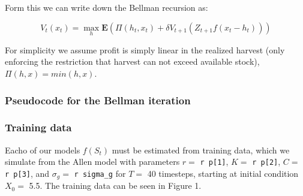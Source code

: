 \documentclass[author-year, review]{elsarticle} %
\newenvironment{Shaded}{}{}
\newcommand{\KeywordTok}[1]{\textcolor[rgb]{0.00,0.44,0.13}{\textbf{{#1}}}}
\newcommand{\DataTypeTok}[1]{\textcolor[rgb]{0.56,0.13,0.00}{{#1}}}
\newcommand{\DecValTok}[1]{\textcolor[rgb]{0.25,0.63,0.44}{{#1}}}
\newcommand{\StringTok}[1]{\textcolor[rgb]{0.25,0.44,0.63}{{#1}}}
\newcommand{\CommentTok}[1]{\textcolor[rgb]{0.38,0.63,0.69}{\textit{{#1}}}}
\newcommand{\NormalTok}[1]{{#1}}
\begin{document}
Form this we can write down the Bellman recursion as:

\[V_t(x_t) = \max_h \mathbf{E} \left(\Pi(h_t, x_t) + \delta V_{t+1}( Z_{t+1} f(x_t - h_t)) \right)\]

For simplicity we assume profit is simply linear in the realized harvest
(only enforcing the restriction that harvest can not exceed available
stock), $\Pi(h,x) = min(h,x)$.

\subsubsection{Pseudocode for the Bellman
iteration}\label{pseudocode-for-the-bellman-iteration}

\begin{Shaded}
\end{Shaded}

\subsubsection{Training data}\label{training-data}

Eacho of our models $f(S_t)$ must be estimated from training data, which
we simulate from the Allen model with parameters $r = $
\texttt{r p{[}1{]}}, $K =$ \texttt{r p{[}2{]}}, $C =$
\texttt{r p{[}3{]}}, and $\sigma_g =$ \texttt{r sigma\_g} for $T=$ 40
timesteps, starting at initial condition $X_0 = $ 5.5. The training data
can be seen in Figure 1.
\end{document}
